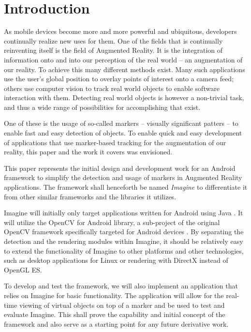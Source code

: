 \section{Introduction}

As mobile devices become more and more powerful and ubiquitous, developers continually realize new uses for them.
One of the fields that is continually reinventing itself is the field of Augmented Reality.
It is the integration of information onto and into our perception of the real world – an augmentation of our reality.
To achieve this many different methods exist.
Many such applications use the user's global position to overlay points of interest onto a camera feed; others use computer vision to track real world objects to enable software interaction with them.
Detecting real world objects is however a non-trivial task, and thus a wide range of possibilities for accomplishing that exist.

One of these is the usage of so-called markers – visually significant patters – to enable fast and easy detection of objects.
To enable quick and easy development of applications that use marker-based tracking for the augmentation of our reality, this paper and the work it covers was envisioned.

This paper represents the initial design and development work for an Android framework to simplify the detection and usage of markers in Augmented Reality applications.
The framework shall henceforth be named \textit{Imagine} to differentiate it from other similar frameworks and the libraries it utilizes.

Imagine will initially only target applications written for Android using Java \cite{android}.
It will utilize the OpenCV for Android library, a sub-project of the original OpenCV framework specifically targeted for Android devices \cite{opencvandroid}.
By separating the detection and the rendering modules within Imagine, it should be relatively easy to extend the functionality of Imagine to other platforms and other technologies, such as desktop applications for Linux or rendering with DirectX instead of OpenGL ES.

To develop and test the framework, we will also implement an application that relies on Imagine for basic functionality.
The application will allow for the real-time viewing of virtual objects on top of a marker and be used to test and evaluate Imagine.
This shall prove the capability and initial concept of the framework and also serve as a starting point for any future derivative work.

